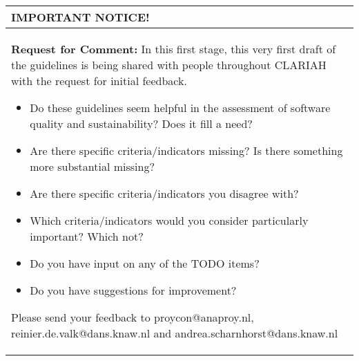 \documentclass[a4paper,11pt]{article}
\newenvironment{notice}{
\begin{center}
    \begin{tabular}[h!]{|p{0.8\textwidth}|}
    \hline
    {\bf IMPORTANT NOTICE!}\\\hline}
{   \\\hline
    \end{tabular}
\end{center}}
\begin{document}
\begin{notice}
\textbf{Request for Comment:} In this first stage, this very first draft of the guidelines is being shared with
people throughout CLARIAH with the request for initial feedback. 
\begin{itemize}
    \item Do these guidelines seem helpful in the assessment of software
        quality and sustainability? Does it fill a need?
    \item Are there specific criteria/indicators missing? Is there something more substantial missing?
    \item Are there specific criteria/indicators you disagree with?
    \item Which criteria/indicators would you consider particularly important?  Which not?
    \item Do you have input on any of the TODO items?
    \item Do you have suggestions for improvement?
\end{itemize}

Please send your feedback to proycon@anaproy.nl, reinier.de.valk@dans.knaw.nl and andrea.scharnhorst@dans.knaw.nl
\end{notice}




\end{document}
